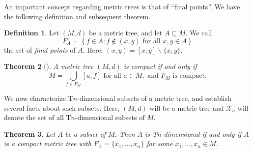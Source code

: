 \documentclass{bcp92}
\theoremstyle{plain}
\newtheorem{thm}{Theorem}[section]
\theoremstyle{definition}
\newtheorem{defi}[thm]{Definition}
\begin{document}
An important concept regarding metric trees is that of ``final points''. We
have the following definition and subsequent theorem.

\begin{defi}
Let $(M,d)$ be a metric tree, and let $A \subseteq M$. We call
$$
F_A = \left\{ f \in A : f \notin (x,y) \text{ for all } x,y \in A \right\}
$$
the set of \textit{final points} of $A$. Here, $(x,y) = [x,y] \backslash \{
x,y \}$.
\end{defi}

\begin{thm}[\cite{AkBo}] \label{compact-tree}
A metric tree $(M,d)$ is compact if and only if
$$
M = \bigcup_{f \in
F_M}{[a,f]} \text{ for all } a \in M, \text{ and } \overline{F}_M \text{ is
compact.}
$$
\end{thm}

We now characterize T$n$-dimensional subsets of a metric tree, and establish
several facts about such subsets. Here, $(M,d)$ will be a metric tree and
$\mathcal{X}_n$ will denote the set of all T$n$-dimensional subsets of $M$.

\begin{thm} \label{dim-char}
Let $A$ be a subset of $M$. Then $A$ is {\rm T}$n$-dimensional if and only if
$A$ is a compact metric tree with $F_A = \{ x_1, \dots, x_{n} \}$ for some
$x_1, \dots, x_{n} \in M$.
\end{thm}
\end{document}
